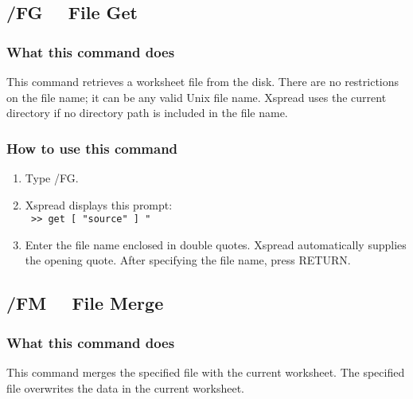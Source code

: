 \subsection*{/FG \ \     File Get}

\subsubsection*{What this command does}
This command retrieves a worksheet file from the disk.  There are no 
restrictions on the file name; it can be any valid Unix file name.  
Xspread uses the current directory if no directory path is included in 
the file name.

\subsubsection*{How to use this command}
\begin{enumerate}
\item{Type /FG.}
\item{Xspread displays this prompt:\\
        \verb| >> get [ "source" ] "| }
\item{Enter the file name enclosed in double quotes.  Xspread
        automatically supplies the opening quote.  After specifying the
        file name, press RETURN.}
\end{enumerate}
        
\subsection*{/FM \ \     File Merge}

\subsubsection*{What this command does}
This command merges the specified file with the current worksheet.  
The specified file overwrites the data in the current worksheet.


